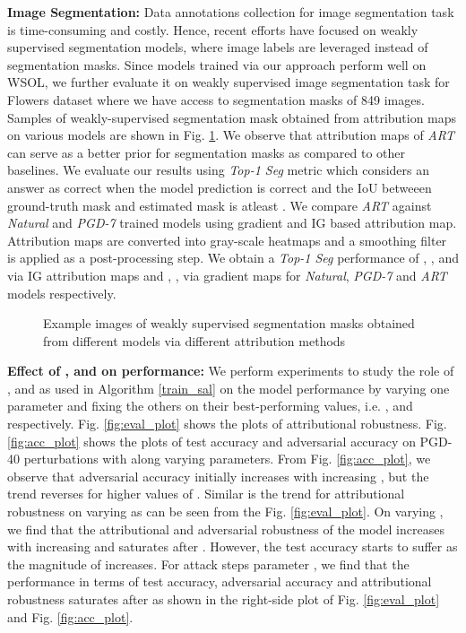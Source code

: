 \documentclass[runningheads]{llncs}
\begin{document}
\noindent\textbf{Image Segmentation:}
Data annotations collection for image segmentation task is time-consuming and costly. Hence, recent efforts \cite{sec,top-down-seg,multitask-seg,superpixel-seg,guided-labeling,graphlet-cut,flower-seg} have focused on weakly supervised segmentation models, where image labels are leveraged instead of segmentation masks. Since models trained via our approach perform well on WSOL, we further evaluate it on weakly supervised image segmentation task for Flowers dataset \cite{flower} where we have access to segmentation masks of 849 images. Samples of weakly-supervised segmentation mask obtained from attribution maps on various models are shown in Fig. \ref{fig:wsos}. We observe that attribution maps of \textit{ART} can serve as a better prior for segmentation masks as compared to other baselines. We evaluate our results using \textit{Top-1 Seg} metric which considers an answer as correct when the model prediction is correct and the IoU betweeen ground-truth mask and estimated mask is atleast . We compare \textit{ART} against \textit{Natural} and \textit{PGD-7} trained models using gradient\cite{attr2013gradient} and IG \cite{attr2017integrated} based attribution map. Attribution maps are converted into gray-scale heatmaps and a smoothing filter is applied as a post-processing step. We obtain a \textit{Top-1 Seg} performance of , , and  via IG attribution maps and , ,  via gradient maps for \textit{Natural}, \textit{PGD-7} and \textit{ART} models respectively. 


\begin{figure}[t]
\centering
{}
\caption{\footnotesize{Example images of weakly supervised segmentation masks obtained from different models via different attribution methods}}
\label{fig:wsos}
\end{figure}

\noindent\textbf{Effect of ,  and  on performance:}
We perform experiments to study the role of ,  and  as used in Algorithm \ref{train_sal} on the model performance by varying one parameter and fixing the others on their best-performing values, i.e. ,  and  respectively. Fig. \ref{fig:eval_plot} shows the plots of attributional robustness. Fig. \ref{fig:acc_plot} shows the plots of test accuracy and adversarial accuracy on  PGD-40 perturbations with  along varying parameters. From Fig. \ref{fig:acc_plot}, we observe that adversarial accuracy initially increases with increasing , but the trend reverses for higher values of . Similar is the trend for attributional robustness on varying  as can be seen from the Fig. \ref{fig:eval_plot}. On varying , we find that the attributional and adversarial robustness of the model increases with increasing  and saturates after . However, the test accuracy starts to suffer as the magnitude of  increases. For attack steps parameter , we find that the performance in terms of test accuracy, adversarial accuracy and attributional robustness saturates after  as shown in the right-side plot of Fig. \ref{fig:eval_plot} and Fig. \ref{fig:acc_plot}.
\end{document}
